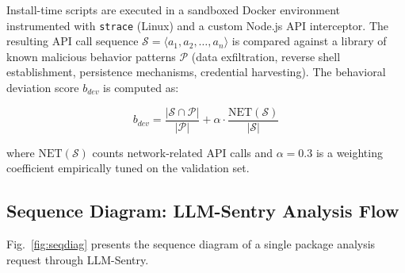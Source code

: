\documentclass[conference]{IEEEtran}
\begin{document}
Install-time scripts are executed in a sandboxed Docker environment instrumented with \texttt{strace} (Linux) and a custom Node.js API interceptor. The resulting API call sequence $\mathcal{S} = \langle a_1, a_2, \ldots, a_n \rangle$ is compared against a library of known malicious behavior patterns $\mathcal{P}$ (data exfiltration, reverse shell establishment, persistence mechanisms, credential harvesting). The behavioral deviation score $b_{dev}$ is computed as:

\begin{equation}
b_{dev} = \frac{|\mathcal{S} \cap \mathcal{P}|}{|\mathcal{P}|} + \alpha \cdot \frac{\text{NET}(\mathcal{S})}{|\mathcal{S}|}
\label{eq:bdev}
\end{equation}

where $\text{NET}(\mathcal{S})$ counts network-related API calls and $\alpha = 0.3$ is a weighting coefficient empirically tuned on the validation set.

\subsection{Sequence Diagram: LLM-Sentry Analysis Flow}

Fig.~\ref{fig:seqdiag} presents the sequence diagram of a single package analysis request through LLM-Sentry.
\end{document}
